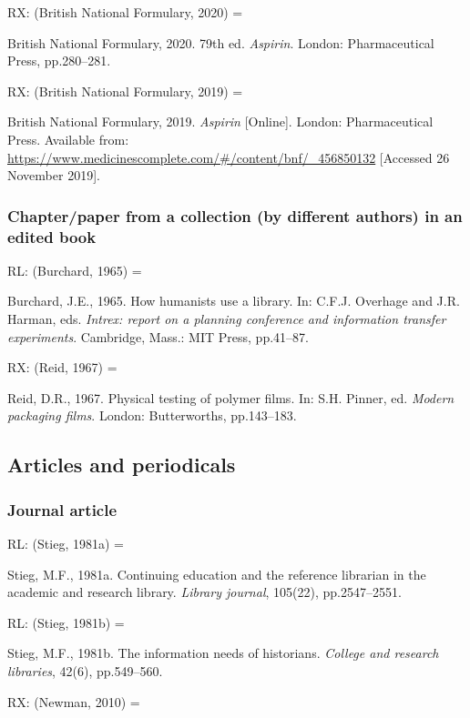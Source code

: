 RX: (British National Formulary, 2020) = \cite{aspirin2020bnf}

British National Formulary, 2020. 79th ed. \emph{Aspirin}. London: Pharmaceutical Press, pp.280--281.


RX: (British National Formulary, 2019) = \cite{aspirin2019bnf}

British National Formulary, 2019. \emph{Aspirin} [Online]. London: Pharmaceutical Press. Available from: \url{https://www.medicinescomplete.com/#/content/bnf/_456850132} [Accessed 26 November 2019].



\subsubsection*{Chapter\slash paper from a collection (by different authors) in an edited book}

RL: (Burchard, 1965) = \cite{burchard1965hhl}

Burchard, J.E., 1965. How humanists use a library. In: C.F.J. Overhage and J.R. Harman, eds. \emph{Intrex: report on a planning conference and information transfer experiments}. Cambridge, Mass.: MIT Press, pp.41--87.


RX: (Reid, 1967) = \cite{reid1967ptp}

Reid, D.R., 1967. Physical testing of polymer films. In: S.H. Pinner, ed. \emph{Modern packaging films}. London: Butterworths, pp.143--183.



\subsection{Articles and periodicals}

\subsubsection*{Journal article}

RL: (Stieg, 1981a) = \cite{stieg1981cer}

Stieg, M.F., 1981a. Continuing education and the reference librarian in the academic and research library. \emph{Library journal}, 105(22), pp.2547--2551.

RL: (Stieg, 1981b) = \cite{stieg1981inh}

Stieg, M.F., 1981b. The information needs of historians. \emph{College and research libraries}, 42(6), pp.549--560.


RX: (Newman, 2010) = \cite{newman2010mcb}

